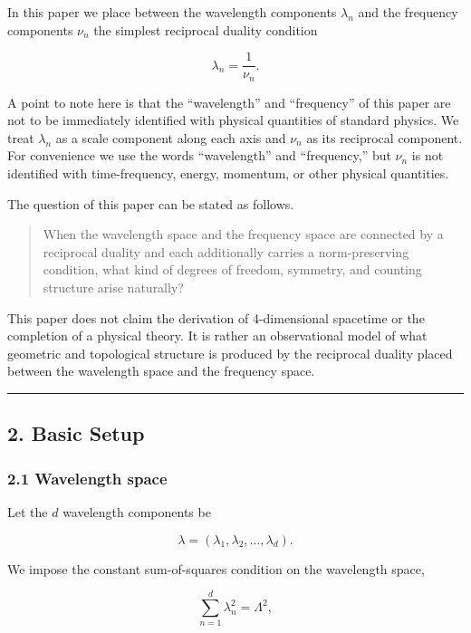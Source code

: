 \documentclass[
]{article}
\begin{document}
In this paper we place between the wavelength components \(\lambda_n\)
and the frequency components \(\nu_n\) the simplest reciprocal duality
condition

\[
\lambda_n=\frac{1}{\nu_n} .
\]

A point to note here is that the ``wavelength'' and ``frequency'' of
this paper are not to be immediately identified with physical quantities
of standard physics. We treat \(\lambda_n\) as a scale component along
each axis and \(\nu_n\) as its reciprocal component. For convenience we
use the words ``wavelength'' and ``frequency,'' but \(\nu_n\) is not
identified with time-frequency, energy, momentum, or other physical
quantities.

The question of this paper can be stated as follows.

\begin{quote}
When the wavelength space and the frequency space are connected by a
reciprocal duality and each additionally carries a norm-preserving
condition, what kind of degrees of freedom, symmetry, and counting
structure arise naturally?
\end{quote}

This paper does not claim the derivation of 4-dimensional spacetime or
the completion of a physical theory. It is rather an observational model
of what geometric and topological structure is produced by the
reciprocal duality placed between the wavelength space and the frequency
space.

\begin{center}\rule{0.5\linewidth}{0.5pt}\end{center}

\subsection{2. Basic Setup}\label{basic-setup}

\subsubsection{2.1 Wavelength space}\label{wavelength-space}

Let the \(d\) wavelength components be

\[
\lambda=(\lambda_1,\lambda_2,\ldots,\lambda_d) .
\]

We impose the constant sum-of-squares condition on the wavelength space,

\[
\sum_{n=1}^{d} \lambda_n^2=\Lambda^2 ,
\]
\end{document}
